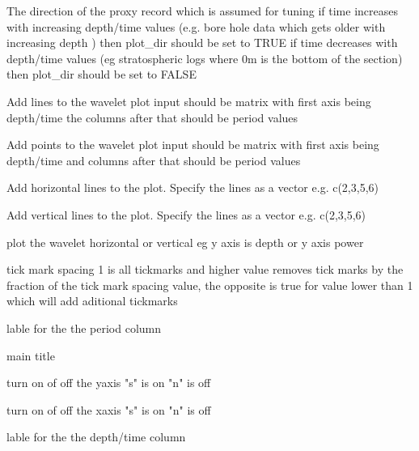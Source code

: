 \documentclass[a4paper]{book}
\begin{document}
\begin{Arguments}
\begin{ldescription}
\item[\code{plot\_dir}] The direction of the proxy record which is assumed for tuning if time increases with increasing depth/time values
(e.g. bore hole data which gets older with increasing depth ) then plot\_dir should be set to TRUE
if time decreases with depth/time values (eg stratospheric logs where 0m is the bottom of the section)
then plot\_dir should be set to FALSE 

\item[\code{add\_lines}] Add  lines to the wavelet plot input should be matrix with first axis being depth/time the columns after that
should be period values  

\item[\code{add\_points}] Add points to the wavelet plot input should be matrix with first axis being depth/time and columns after that
should be period values 

\item[\code{add\_abline\_h}] Add horizontal lines to the plot. Specify the lines as a vector e.g. c(2,3,5,6)  

\item[\code{add\_abline\_v}] Add vertical lines to the plot. Specify the lines as a vector e.g. c(2,3,5,6)  

\item[\code{plot\_horizontal}] plot the wavelet horizontal or vertical eg y axis is depth or y axis power 

\item[\code{period\_ticks}] tick mark spacing 1 is all tickmarks and higher value removes tick marks by
the fraction of the tick mark spacing value, the opposite is true for value lower than 1 which
will add aditional tickmarks

\item[\code{periodlab}] lable for the the period column

\item[\code{main}] main title

\item[\code{yaxt}] turn on of off the yaxis "s" is on "n" is off 

\item[\code{xaxt}] turn on of off the xaxis "s" is on "n" is off 

\item[\code{depth\_time\_lab}] lable for the the depth/time column
\end{ldescription}
\end{Arguments}
\end{document}
